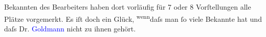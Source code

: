                   Bekannten des Bearbeiters haben dort vorläufig für 7 oder 8 Vorſtellungen alle
                  Plätze vorgemerkt. Es iſt doch ein Glück, \substVorne{}\textsuperscript{wenn}\substDazwischen{}daſs\substHinten{} man ſo viele {\pb}Bekannte
                  hat und daſs Dr. \textcolor{blue}{Goldmann}{}\ledrightnote{\textcolor{blue}{Paul Goldmann}} nicht zu ihnen
                  gehört.\pend
           \endnumbering{}  
      